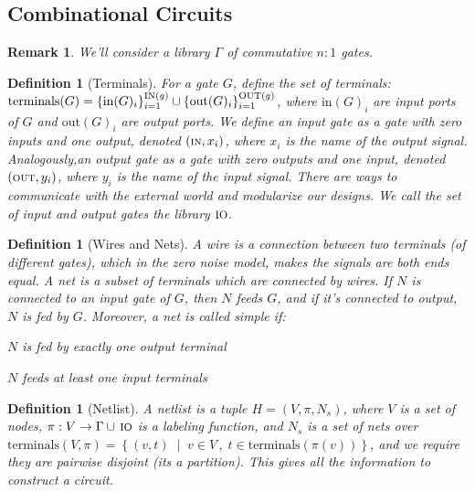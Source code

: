 \documentclass[12pt]{article}
\newcommand{\set}[2]{\left\{{#1}\;\middle|\;{#2}\right\}}
\newcommand{\scr}[1]{{\scriptstyle\textup{#1}}}
\newcommand{\scrf}[1]{{\scriptstyle\textup{\footnotesize #1}}}
\newtheorem{definition}[theorem]{Definition}
\newtheorem{remark}[theorem]{Remark}
\begin{document}
\pagebreak

\subsection{Combinational Circuits}

\begin{remark}
  We'll consider a library $\Gamma$ of commutative $n:1$ gates.
\end{remark}

\begin{definition}[Terminals]
  For a gate $G$, define the set of terminals: $\text{terminals}(G)=\{\text{in}(G)_i\}_{i=1}^{\scr{IN}(g)}\cup \{\text{out}(G)_i\}_{i=1}^{\scr{OUT}(g)}$, where $\text{in}(G)_i$ are input ports of $G$ and $\text{out}(G)_i$ are output ports. We define an input gate as a gate with zero inputs and one output, denoted $(\scr{IN},x_i)$, where $x_i$ is the name of the output signal. Analogously,an output gate as a gate with zero outputs and one input, denoted $(\scr{OUT},y_i)$, where $y_i$ is the name of the input signal. There are ways to communicate with the external world and modularize our designs. We call the set of input and output gates the library $\scrf{IO}$.
\end{definition}

\begin{definition}[Wires and Nets]
  A wire is a connection between two terminals (of different gates), which in the zero noise model, makes the signals are both ends equal. A net is a subset of terminals which are connected by wires. If $N$ is connected to an input gate of $G$, then $N$ feeds $G$, and if it's connected to output, $N$ is fed by $G$. Moreover, a net is called simple if:
  \begin{compactenum}[(i)]
    \item $N$ is fed by exactly one output terminal
    \item $N$ feeds at least one input terminals
  \end{compactenum}
\end{definition}

\begin{definition}[Netlist]
  A netlist is a tuple $H=(V,\pi,N_s)$, where $V$ is a set of nodes, $\pi:V\to\Gamma\cup\,\scrf{IO}$ is a labeling function, and $N_s$ is a set of nets over $\text{terminals}(V,\pi)=\set{(v,t)}{v\in V\,,\; t\in\text{terminals}(\pi(v))}$, and we require they are pairwise disjoint (its a partition). This gives all the information to construct a circuit.
\end{definition}
\end{document}
